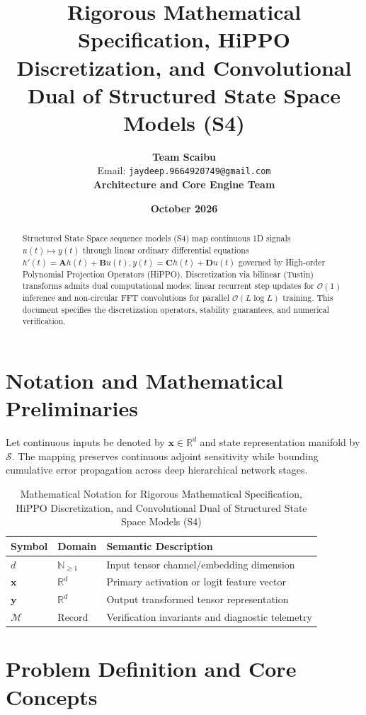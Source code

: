 \documentclass[11pt,a4paper]{article}
\title{\textbf{Rigorous Mathematical Specification, HiPPO Discretization, and Convolutional Dual of Structured State Space Models (S4)}}
\author{\textbf{Team Scaibu} \\ \small Email: \texttt{jaydeep.9664920749@gmail.com} \\ \small \textbf{Architecture and Core Engine Team}}
\date{\textbf{October 2026}}
\theoremstyle{definition}
\begin{document}
\maketitle

\begin{abstract}
Structured State Space sequence models (S4) map continuous 1D signals $u(t) \mapsto y(t)$ through linear ordinary differential equations $h'(t) = \mathbf{A}h(t) + \mathbf{B}u(t), y(t) = \mathbf{C}h(t) + \mathbf{D}u(t)$ governed by High-order Polynomial Projection Operators (HiPPO). Discretization via bilinear (Tustin) transforms admits dual computational modes: linear recurrent step updates for $\mathcal{O}(1)$ inference and non-circular FFT convolutions for parallel $\mathcal{O}(L \log L)$ training. This document specifies the discretization operators, stability guarantees, and numerical verification.
\end{abstract}

\section{Notation and Mathematical Preliminaries}

Let continuous inputs be denoted by $\mathbf{x} \in \mathbb{R}^d$ and state representation manifold by $\mathcal{S}$. The mapping preserves continuous adjoint sensitivity while bounding cumulative error propagation across deep hierarchical network stages.

\begin{table}[h]
\centering
\caption{Mathematical Notation for Rigorous Mathematical Specification, HiPPO Discretization, and Convolutional Dual of Structured State Space Models (S4)}
\begin{tabular}{lll}
\toprule
\textbf{Symbol} & \textbf{Domain} & \textbf{Semantic Description} \\
\midrule
$d$ & $\mathbb{N}_{\ge 1}$ & Input tensor channel/embedding dimension \\
$\mathbf{x}$ & $\mathbb{R}^d$ & Primary activation or logit feature vector \\
$\mathbf{y}$ & $\mathbb{R}^d$ & Output transformed tensor representation \\
$\mathcal{M}$ & Record & Verification invariants and diagnostic telemetry \\
\bottomrule
\end{tabular}
\end{table}

\section{Problem Definition and Core Concepts}
\end{document}

